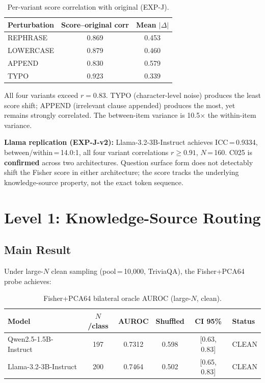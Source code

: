 \documentclass[11pt]{article}
\begin{document}
\begin{table}[h!]
\centering
\caption{Per-variant score correlation with original (EXP-J).}
\begin{tabular}{lcc}
\toprule
Perturbation & Score--original corr & Mean $|\Delta|$ \\
\midrule
REPHRASE & 0.869 & 0.453 \\
LOWERCASE & 0.879 & 0.460 \\
APPEND & 0.830 & 0.579 \\
TYPO & 0.923 & 0.339 \\
\bottomrule
\end{tabular}
\end{table}

All four variants exceed $r=0.83$. TYPO (character-level noise) produces the least
score shift; APPEND (irrelevant clause appended) produces the most, yet remains strongly
correlated. The between-item variance is 10.5$\times$ the within-item variance.

\textbf{Llama replication (EXP-J-v2):} Llama-3.2-3B-Instruct achieves ICC\,=\,0.9334,
between/within\,=\,14.0:1, all four variant correlations $r \geq 0.91$, $N$\,=\,160.
C025 is \textbf{confirmed} across two architectures. Question surface form does not
detectably shift the Fisher score in either architecture; the score tracks the underlying
knowledge-source property, not the exact token sequence.

\section{Level 1: Knowledge-Source Routing}
\label{sec:l1}

\subsection{Main Result}

Under large-$N$ clean sampling (pool\,=\,10,000, TriviaQA), the Fisher+PCA64 probe achieves:

\begin{table}[h!]
\centering
\caption{Fisher+PCA64 bilateral oracle AUROC (large-$N$, clean).}
\begin{tabular}{lccccl}
\toprule
Model & $N$/class & AUROC & Shuffled & CI 95\% & Status \\
\midrule
Qwen2.5-1.5B-Instruct & 197 & 0.7312 & 0.598 & [0.63, 0.83] & CLEAN \\
Llama-3.2-3B-Instruct & 200 & 0.7464 & 0.502 & [0.65, 0.83] & CLEAN \\
\bottomrule
\end{tabular}
\end{table}
\end{document}
